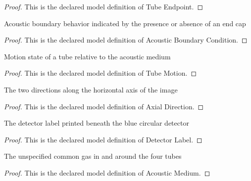 \begin{proof}
  This is the declared model definition of Tube Endpoint.
\end{proof}
\begin{definition}
  \label{def:physics:phyx-mini-0320:phyxminiproblems-problemphyxmini0320-acousticboundarycondition}
  Acoustic boundary behavior indicated by the presence or absence of an end cap
\end{definition}
\begin{proof}
  This is the declared model definition of Acoustic Boundary Condition.
\end{proof}
\begin{definition}
  \label{def:physics:phyx-mini-0320:phyxminiproblems-problemphyxmini0320-tubemotion}
  Motion state of a tube relative to the acoustic medium
\end{definition}
\begin{proof}
  This is the declared model definition of Tube Motion.
\end{proof}
\begin{definition}
  \label{def:physics:phyx-mini-0320:phyxminiproblems-problemphyxmini0320-axialdirection}
  The two directions along the horizontal axis of the image
\end{definition}
\begin{proof}
  This is the declared model definition of Axial Direction.
\end{proof}
\begin{definition}
  \label{def:physics:phyx-mini-0320:phyxminiproblems-problemphyxmini0320-detectorlabel}
  The detector label printed beneath the blue circular detector
\end{definition}
\begin{proof}
  This is the declared model definition of Detector Label.
\end{proof}
\begin{definition}
  \label{def:physics:phyx-mini-0320:phyxminiproblems-problemphyxmini0320-acousticmedium}
  The unspecified common gas in and around the four tubes
\end{definition}
\begin{proof}
  This is the declared model definition of Acoustic Medium.
\end{proof}
